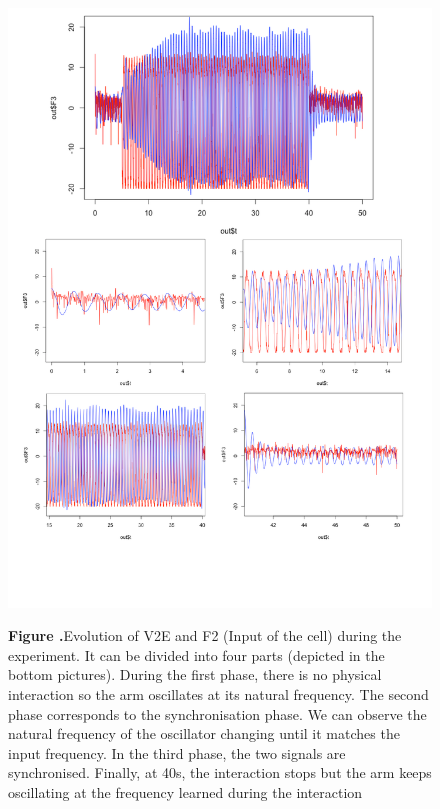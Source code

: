 \documentclass{report}
\begin{document}
\begin{figure}[h!]
\begin{center}
\includegraphics[width=15cm]{figures/oscillator_F3-v3.pdf}
\end{center}
 \textbf{\label{fig:05} Figure .}{Evolution of V2E and F2 (Input of the cell) during the experiment. It can be divided into four parts (depicted in the bottom pictures). During the first phase, there is no physical interaction so the arm oscillates at its natural frequency. The second phase corresponds to the synchronisation phase. We can observe the natural frequency of the oscillator changing until it matches the input frequency. In the third phase, the two signals are synchronised. Finally, at 40s, the interaction stops but the arm keeps oscillating at the frequency learned during the interaction}
\end{figure}
\end{document}
